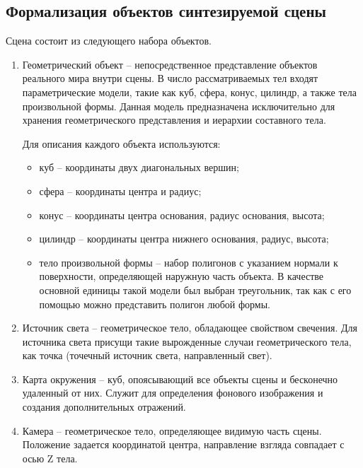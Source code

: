 \subsection{Формализация объектов синтезируемой сцены}
Сцена состоит из следующего набора объектов.
\begin{enumerate}
    \item Геометрический объект -- непосредственное представление объектов реального
          мира внутри сцены. В число рассматриваемых тел входят параметрические
          модели, такие как куб, сфера, конус, цилиндр, а также тела произвольной
          формы. Данная модель предназначена исключительно для хранения
          геометрического представления и иерархии составного тела.

          Для описания каждого объекта используются:
          \begin{itemize}
              \item куб -- координаты двух диагональных вершин;
              \item сфера -- координаты центра и радиус;
              \item конус -- координаты центра основания, радиус основания, высота;
              \item цилиндр -- координаты центра нижнего основания, радиус, высота;
              \item тело произвольной формы -- набор полигонов с указанием нормали к
                    поверхности, определяющей наружную часть объекта. В качестве основной
                    единицы такой модели был выбран треугольник, так как с его помощью
                    можно представить полигон любой формы.
          \end{itemize}
    \item Источник света -- геометрическое тело, обладающее свойством свечения. Для
          источника света присущи такие вырожденные случаи геометрического тела,
          как точка (точечный источник света, направленный свет).
    \item Карта окружения -- куб, опоясывающий все объекты сцены и бесконечно
          удаленный от них. Служит для определения фонового изображения и создания
          дополнительных отражений.
    \item Камера -- геометрическое тело, определяющее видимую часть сцены.
          Положение задается координатой центра, направление взгляда совпадает с
          осью Z тела.
\end{enumerate}

